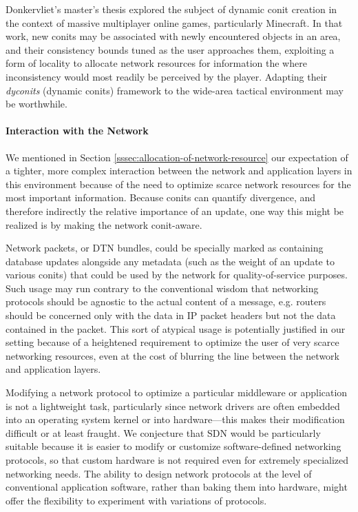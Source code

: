 \documentclass[]             %
{NASA}                       %
\theoremstyle{definition}
\begin{document}
Donkervliet's master's thesis \cite{dyconits} explored the subject of
dynamic conit creation in the context of massive multiplayer online
games, particularly Minecraft. In that work, new conits may be
associated with newly encountered objects in an area, and their
consistency bounds tuned as the user approaches them, exploiting a
form of locality to allocate network resources for information the
where inconsistency would most readily be perceived by the
player. Adapting their \emph{dyconits} (dynamic conits) framework to
the wide-area tactical environment may be worthwhile.

\paragraph{Interaction with the Network}
We mentioned in Section \ref{sssec:allocation-of-network-resource} our
expectation of a tighter, more complex interaction between the network
and application layers in this environment because of the need to
optimize scarce network resources for the most important
information. Because conits can quantify divergence, and therefore
indirectly the relative importance of an update, one way this might be
realized is by making the network conit-aware.

Network packets, or DTN bundles, could be specially marked as
containing database updates alongside any metadata (such as the weight
of an update to various conits) that could be used by the network for
quality-of-service purposes. Such usage may run contrary to the
conventional wisdom that networking protocols should be agnostic to
the actual content of a message, e.g. routers should be concerned only
with the data in IP packet headers but not the data contained in the
packet. This sort of atypical usage is potentially justified in our
setting because of a heightened requirement to optimize the user of
very scarce networking resources, even at the cost of blurring the
line between the network and application layers.

Modifying a network protocol to optimize a particular middleware or
application is not a lightweight task, particularly since network
drivers are often embedded into an operating system kernel or into
hardware---this makes their modification difficult or at least
fraught. We conjecture that SDN would be particularly suitable because
it is easier to modify or customize software-defined networking
protocols, so that custom hardware is not required even for extremely
specialized networking needs. The ability to design network protocols
at the level of conventional application software, rather than baking
them into hardware, might offer the flexibility to experiment with
variations of protocols.
\end{document}
